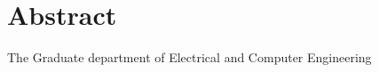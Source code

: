\chapter*{Abstract}
\setcounter{page}{2}

\begin{doublespace}
\begin{center}
\textsc{\thesisTitle{}}
 
\candidateName{}

\degreeName{} 

The Graduate department of Electrical and Computer Engineering \\
\universityName{}

\graduationYear{}
\end{center}

\blindtext

\end{doublespace}
